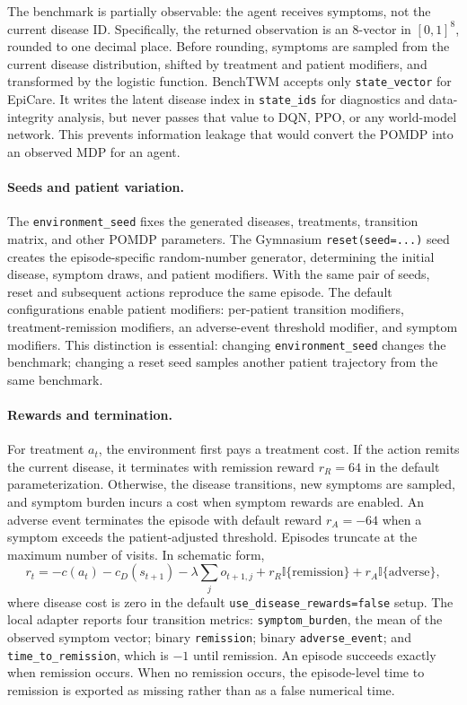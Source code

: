 \documentclass[10pt,twocolumn]{article}
\newcommand{\code}[1]{\texttt{#1}}
\newcommand{\indicator}{\mathbb{I}}
\begin{document}
The benchmark is partially observable: the agent receives symptoms, not the current disease ID. Specifically, the returned observation is an 8-vector in $[0,1]^8$, rounded to one decimal place. Before rounding, symptoms are sampled from the current disease distribution, shifted by treatment and patient modifiers, and transformed by the logistic function. BenchTWM accepts only \code{state\_vector} for EpiCare. It writes the latent disease index in \code{state\_ids} for diagnostics and data-integrity analysis, but never passes that value to DQN, PPO, or any world-model network. This prevents information leakage that would convert the POMDP into an observed MDP for an agent.

\paragraph{Seeds and patient variation.}
The \code{environment\_seed} fixes the generated diseases, treatments, transition matrix, and other POMDP parameters. The Gymnasium \code{reset(seed=...)} seed creates the episode-specific random-number generator, determining the initial disease, symptom draws, and patient modifiers. With the same pair of seeds, reset and subsequent actions reproduce the same episode. The default configurations enable patient modifiers: per-patient transition modifiers, treatment-remission modifiers, an adverse-event threshold modifier, and symptom modifiers. This distinction is essential: changing \code{environment\_seed} changes the benchmark; changing a reset seed samples another patient trajectory from the same benchmark.

\paragraph{Rewards and termination.}
For treatment $a_t$, the environment first pays a treatment cost. If the action remits the current disease, it terminates with remission reward $r_R=64$ in the default parameterization. Otherwise, the disease transitions, new symptoms are sampled, and symptom burden incurs a cost when symptom rewards are enabled. An adverse event terminates the episode with default reward $r_A=-64$ when a symptom exceeds the patient-adjusted threshold. Episodes truncate at the maximum number of visits. In schematic form,
\begin{equation}
 r_t = -c(a_t) - c_D(s_{t+1}) - \lambda \sum_j o_{t+1,j}
       + r_R\indicator\{\mathrm{remission}\} + r_A\indicator\{\mathrm{adverse}\},
\end{equation}
where disease cost is zero in the default \code{use\_disease\_rewards=false} setup. The local adapter reports four transition metrics: \code{symptom\_burden}, the mean of the observed symptom vector; binary \code{remission}; binary \code{adverse\_event}; and \code{time\_to\_remission}, which is $-1$ until remission. An episode succeeds exactly when remission occurs. When no remission occurs, the episode-level time to remission is exported as missing rather than as a false numerical time.
\end{document}
